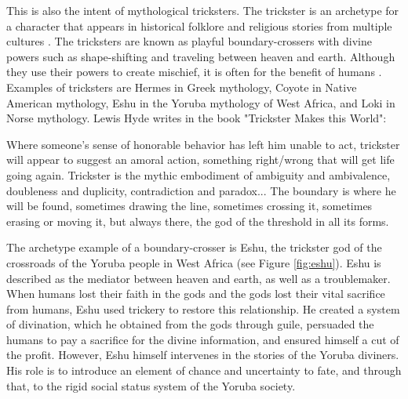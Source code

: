 \documentclass[dissertation,math,vertlayout,pdfa,colorlinks,nologo]{aaltoseries}
\begin{document}
This is also the intent of mythological tricksters. The trickster is an archetype for a character that appears in historical folklore and religious stories from multiple cultures \cite{hydeTricksterMakesThis2017}. The tricksters are known as playful boundary-crossers with divine powers such as shape-shifting and traveling between heaven and earth. Although they use their powers to create mischief, it is often for the benefit of humans \cite{hydeTricksterMakesThis1997}. Examples of tricksters are Hermes in Greek mythology, Coyote in Native American mythology, Eshu in the Yoruba mythology of West Africa, and Loki in Norse mythology. Lewis Hyde writes in the book "Trickster Makes this World":
\begin{displayquote}
Where someone’s sense of honorable behavior has left him unable to act, trickster will appear to suggest an amoral action, something right/wrong that will get life going again. Trickster is the mythic embodiment of ambiguity and ambivalence, doubleness and duplicity, contradiction and paradox... The boundary is where he will be found, sometimes drawing the line, sometimes crossing it, sometimes erasing or moving it, but always there, the god of the threshold in all its forms.
\end{displayquote}
The archetype example of a boundary-crosser is Eshu, the trickster god of the crossroads of the Yoruba people in West Africa \cite[ch. 5]{hydeTricksterMakesThis2017} (see Figure \ref{fig:eshu}). Eshu is described as the mediator between heaven and earth, as well as a troublemaker. When humans lost their faith in the gods and the gods lost their vital sacrifice from humans, Eshu used trickery to restore this relationship. He created a system of divination, which he obtained from the gods through guile, persuaded the humans to pay a sacrifice for the divine information, and ensured himself a cut of the profit. However, Eshu himself intervenes in the stories of the Yoruba diviners. His role is to introduce an element of chance and uncertainty to fate, and through that, to the rigid social status system of the Yoruba society. 
\end{document}
